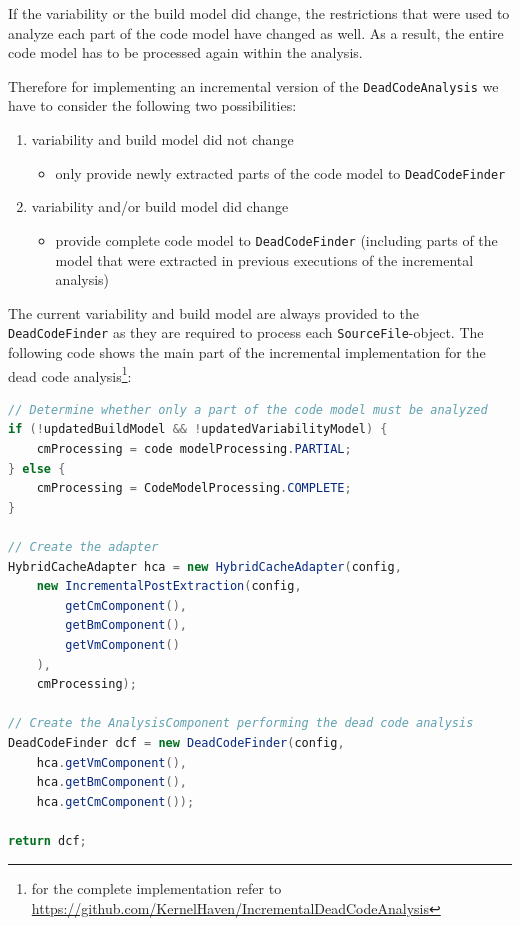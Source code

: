 \documentclass[a4paper]{article}
\begin{document}
If the variability or the build model did change, the restrictions that were used to analyze each part of the code model have changed as well. As a result, the entire code model has to be processed again within the analysis.

Therefore for implementing an incremental version of the \texttt{Dead\-Code\-Analysis} we have to consider the following two possibilities:

\begin{enumerate}
 \item variability and build model did not change
 \begin{itemize}
 	\item only provide newly extracted parts of the code model to \texttt{Dead\-Code\-Finder}
 \end{itemize}
  \item variability and/or build model did change
 \begin{itemize}
 	\item provide complete code model to \texttt{Dead\-Code\-Finder} (including parts of the model that were extracted in previous executions of the incremental analysis)
 \end{itemize}
\end{enumerate}

The current variability and build model are always provided to the \texttt{Dead\-Code\-Finder} as they are required to process each \texttt{Source\-File}-object. The following code shows the main part of the incremental implementation for the dead code analysis\footnote{for the complete implementation refer to \url{https://github.com/KernelHaven/IncrementalDeadCodeAnalysis}}:

\begin{lstlisting}[language=java]
// Determine whether only a part of the code model must be analyzed
if (!updatedBuildModel && !updatedVariabilityModel) {
    cmProcessing = code modelProcessing.PARTIAL;
} else {
    cmProcessing = CodeModelProcessing.COMPLETE;
}

// Create the adapter
HybridCacheAdapter hca = new HybridCacheAdapter(config,
    new IncrementalPostExtraction(config, 
        getCmComponent(), 
        getBmComponent(), 
        getVmComponent()
    ),
    cmProcessing);

// Create the AnalysisComponent performing the dead code analysis
DeadCodeFinder dcf = new DeadCodeFinder(config, 
    hca.getVmComponent(), 
    hca.getBmComponent(),
    hca.getCmComponent());

return dcf;
\end{lstlisting}
\end{document}
